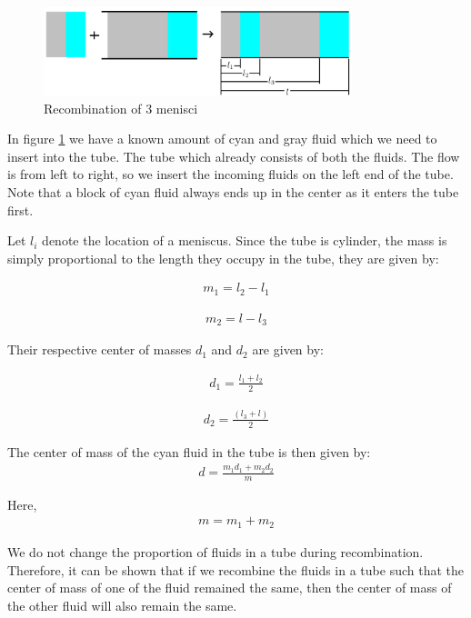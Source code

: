 \documentclass{crm-article}
\begin{document}
		\begin{figure}[H]
			\centering
			\includegraphics[width=0.8\textwidth]{fig_center-of-mass_1}
			\caption{Recombination of 3 menisci}
			\label{fig_center-of-mass_1}
		\end{figure}
		
		In figure \ref{fig_center-of-mass_1} we have a known amount of cyan and gray fluid which we need to insert into the tube. The tube which already consists of both the fluids. The flow is from left to right, so we insert the incoming fluids on the left end of the tube. Note that a block of cyan fluid always ends up in the center as it enters the tube first.
		
		Let $l_{i}$ denote the location of a meniscus. Since the tube is cylinder, the mass is simply proportional to the length they occupy in the tube, they are given by:
		
		\begin{gather}
			m_1 = l_2 - l_1 
		\end{gather}
		
		\begin{gather}
			m_2 = l - l_3
		\end{gather}
		
		Their respective center of masses $d_1$ and $d_2$ are given by:
		
		\begin{gather}	
			d_1 = \frac{l_1 + l_2}{2}
		\end{gather}
		
		\begin{gather}	
			d_2 = \frac{(l_3 + l)}{2}
		\end{gather}
		
		The center of mass of the cyan fluid in the tube is then given by:
		\begin{gather}
			d = \frac{m_1 d_1 + m_2 d_2}{m}
		\end{gather}
		
		Here,
		\begin{gather}
			m = m_1 + m_2
		\end{gather}
		
		
		We do not change the proportion of fluids in a tube during recombination. Therefore, it can be shown that if we recombine the fluids in a tube such that the center of mass of one of the fluid remained the same, then the center of mass of the other fluid will also remain the same.
		
\end{document}
